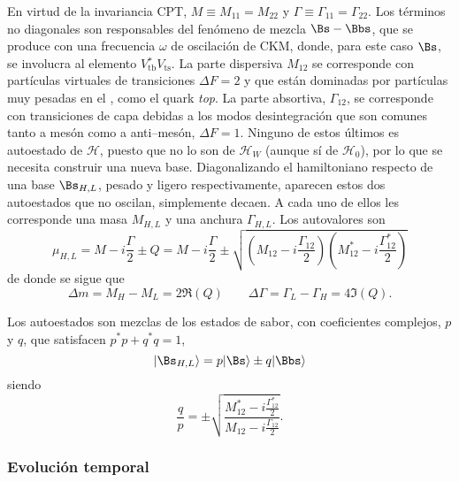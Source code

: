 En virtud de la invariancia CPT, $M \equiv M_{11} = M_{22}$ y $\Gamma \equiv \Gamma_{11}=\Gamma_{22}$. Los términos no diagonales son responsables del fenómeno de mezcla $\Bs - \Bbs$, que se produce con una frecuencia $\omega$ de oscilación de CKM, donde, para este caso $\Bs$, se involucra al elemento $ V{}_{\text{tb}}^* V{}_{\text{ts}}$. La parte dispersiva $M_{12}$ se corresponde con partículas virtuales de transiciones $\Delta F = 2$ y que están dominadas por partículas muy pesadas en el \stdmod, como el quark \textit{top}. La parte absortiva, $\Gamma_{12}$, se corresponde con transiciones de capa debidas a los modos desintegración que son comunes tanto a mesón como a anti--mesón, $\Delta F = 1$. Ninguno de estos últimos es autoestado de $\mathcal{H}$, puesto que no lo son de $\mathcal{H}_W$ (aunque sí de $\mathcal{H}_0$), por lo que se necesita construir una nueva base. Diagonalizando el hamiltoniano respecto de una base ${\Bs}_{H,L}$, pesado y ligero respectivamente, aparecen estos dos autoestados que no oscilan, simplemente decaen. A cada uno de ellos les corresponde una masa $M_{H,L}$ y una anchura $\Gamma_{H,L}$. Los autovalores son
%
\[\mu_{H,L} = M - i\frac{\Gamma}{2} \pm Q = M - i\frac{\Gamma}{2} \pm \sqrt{\left(M_{12}-i\frac{\Gamma_{12}}{2}\right) \left(M_{12}^*-i\frac{\Gamma_{12}^*}{2}\right)}\]
de donde se sigue que 
\[\Delta m = M_H - M_L =2 \Re (Q) \qquad \Delta \Gamma = \Gamma_L - \Gamma_H = 4 \Im (Q).\]
 
Los autoestados son mezclas de los estados de sabor, con coeficientes complejos, $p$ y $q$, que satisfacen $p^*p + q^*q = 1$,
%
\[| {\Bs}_{H,L} \rangle = p |\Bs \rangle \pm q | \Bbs \rangle \]
%
siendo 
\begin{equation}
\frac{q}{p}  = \pm \sqrt{\frac {M_{12}^*-i\frac{\Gamma_{12}^*}{2}} {M_{12}-i\frac{\Gamma_{12}}{2}} }	.\label{eq_qp_cocient}
\end{equation}



\subsubsection{Evolución temporal} %
\label{sec_evotempB}

